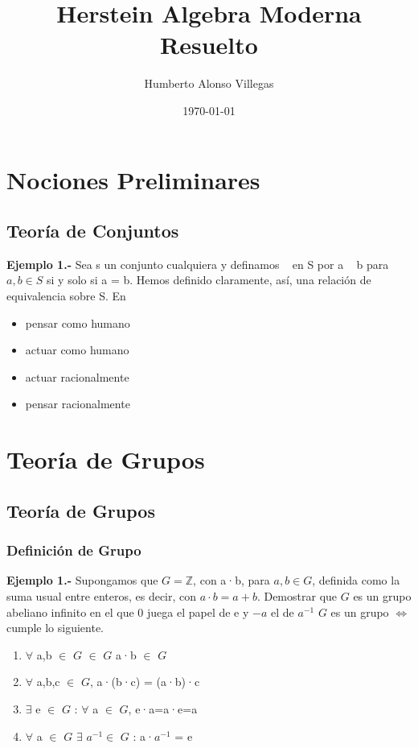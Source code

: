 \documentclass[10pt,a4paper,oneside]{article}
\title{Herstein Algebra Moderna\\Resuelto} %
\author{Humberto Alonso Villegas} %
\date{\today} %
\begin{document}
	\maketitle %
	\newpage
	
	\chapter{Nociones Preliminares}
		\section[''Teoría de Conjuntos'']{Teoría de Conjuntos}
			\textbf{Ejemplo 1.-} Sea s un conjunto cualquiera y definamos ~ en S por a ~ b para $a, b \in S $ si y solo si a = b. Hemos definido claramente, así, una relación de equivalencia sobre S. En 
			
			\begin{itemize}
			\item pensar como humano
			\item actuar como humano
			\item actuar racionalmente
			\item pensar racionalmente
			\end {itemize}
			\newpage
	\newpage



	\chapter{Teoría de Grupos}
		\section["Teoría de"]{Teoría de Grupos}
			\subsection{Definición de Grupo}
				\textbf{Ejemplo 1.-} Supongamos que $G = \mathbb{Z}$, con a·b, para $a,b\in G$, definida como la suma usual entre enteros, es decir, con $a·b=a+b$. Demostrar que $G$ es un grupo abeliano infinito en el que 0 juega el papel de e y $-a$ el de $a^{-1}$
				$G$ es un grupo $\iff$ cumple lo siguiente.
				\begin{enumerate}
					\item $\forall$ a,b $\in$ $G$ $\in$ $G$ a·b $\in$ $G$
					\item $\forall$ a,b,c $\in$ $G$, a·(b·c) = (a·b)·c
					\item $\exists$ e $\in$ $G$ : $\forall$ a $\in$ $G$, e·a=a·e=a
					\item $\forall$ a $\in$ $G$ $\exists$ $a^{-1} \in$ $G$ : a·$a^{-1}$ = e
				\end{enumerate}
\end{document}
